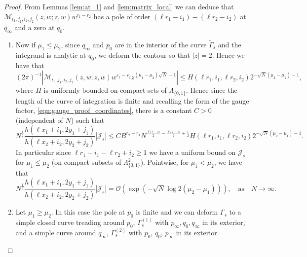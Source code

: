 \documentclass[10pt,a4paper]{amsart}
\begin{document}
\begin{proof}
From Lemmas \ref{lem:at_1} and \ref{lem:matrix_local} we can deduce that
$\boldsymbol{\mathcal{M}}_{i_1,j_1,i_2,j_2}(z,w;z,w) 
w^{r_1-r_2}$
has a pole of order $(\ell r_1-i_1)-(\ell r_2-i_2)$ at $q_{\infty}$ and a zero at $q_0$.
\begin{enumerate}
\item
Now if $\mu_1 \leq \mu_2$, since $q_{\infty}$ and $p_0$ are in the interior of the curve $\tilde{\Gamma}_s$ and the integrand is analytic at $q_0$, we deform the contour so that $|z|=2$. Hence we have that 
\begin{equation}
(2\pi)^{-1}\left|\boldsymbol{\mathcal{M}}_{i_1,j_1,i_2,j_2}(z,w;z,w) 
w^{r_1-r_2}
z^{(\mu_1-\mu_2)\sqrt{N}-1}\right|
\leq H(\ell r_1, i_1, \ell r_2, i_2) 2^{-\sqrt{N}(\mu_2-\mu_1)-1}
,
\end{equation}
where $H$ is uniformly bounded on compact sets of $\Lambda_{\{0,1\}}$. 
Hence since the length of the curve of integration is finite and recalling the form of the gauge factor, \eqref{eqn:gauge_proof_coordinates},  
there is a constant $C>0$ (independent of $N$) such that
$$N^{\frac{1}{2}}
\frac{h(\ell x_1+i_1,2y_1+j_1)}{h(\ell x_2+i_2,2y_2+j_2)}  |\mathcal{J}_s|\leq 
 C B^{r_2-r_1} 
N^{\frac{\ell r_2-i_2}{2}-\frac{\ell r_1-i_1}{2}+\frac{1}{2}}
 H(\ell r_1, i_1, \ell r_2, i_2)  2^{-\sqrt{N}(\mu_2-\mu_1)-1}.
 $$
In particular since $\ell r_1-i_1-\ell r_2 +i_2 \geq 1$ we have a uniform bound on $\mathcal{J}_s$ for $\mu_1\leq \mu_2$ (on compact subsets of $\Lambda_{\{0,1\}}^2$). %
%
Pointwise, for $\mu_1<\mu_2$, we have that
\begin{equation}
N^{\frac{1}{2}}
\frac{h(\ell x_1+i_1,2y_1+j_1)}{h(\ell x_2+i_2,2y_2+j_2)}
 |\mathcal{J}_{s}|
=\mathcal{O}
\left(\exp\left(-\sqrt{N}\log 2(\mu_2-\mu_1)\right)\right), \quad \text{as}\quad N\rightarrow\infty.
\end{equation}
\item
Let $\mu_1\geq \mu_2$. In this case the pole at $p_0$ is finite and we can deform $\Gamma_s$ to a simple closed curve treading around $p_0$, $\Gamma_s^{(1)}$ with $p_{\infty}, q_{0}, q_{\infty}$ in its exterior, and a simple curve around $q_{\infty}$, $\Gamma_s^{(2)}$ with $p_0$, $q_0$, $p_{\infty}$ in its exterior. 


\end{enumerate}
\end{proof}
\end{document}
